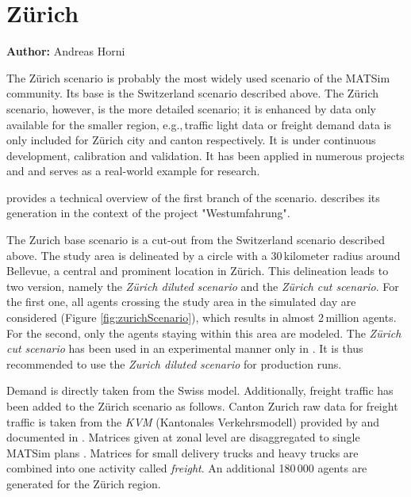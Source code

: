 \section{Zürich}
\label{sec:zhscenario}
\hfill \textbf{Author:} Andreas Horni

The Zürich scenario is probably the most widely used scenario of the MATSim community. Its base is the Switzerland scenario described above. The Zürich scenario, however, is the more detailed scenario; it is enhanced by data only available for the smaller region, e.g.,\,traffic light data or freight demand data is only included for Zürich city and canton respectively. It is under continuous development, calibration and validation. It has been applied in numerous projects and and serves as a real-world example for research.   

\citet{HorniEtAl_TechRep_IVT_2011_a} provides a technical overview of the first branch of the scenario. \citet[][]{BalmerEtAl_ResRep_bdktzrh_2009} describes its generation in the context of the project "Westumfahrung". 

The Zurich base scenario is a cut-out from the Switzerland scenario described above. The study area is delineated by a circle with a 30\,kilometer radius around Bellevue, a central and prominent location in Zürich. This delineation leads to two version, namely the \emph{Zürich diluted scenario} and the \emph{Zürich cut scenario}. For the first one, all agents crossing the study area in the simulated day are considered (Figure \ref{fig:zurichScenario}), which results in almost 2\,million agents. For the second, only the agents staying within this area are modeled. The \emph{Zürich cut scenario} has been used in an experimental manner only in \citet[][]{Hackney_PhDThesis_2009}. It is thus recommended to use the \emph{Zurich diluted scenario} for production runs.

Demand is directly taken from the Swiss model. Additionally, freight traffic has been added to the Zürich scenario as follows. Canton Zurich raw data for freight traffic is taken from the \emph{KVM} (Kantonales Verkehrsmodell) provided by \citet{AMV_Webpage_2011} and documented in \citet[][]{GottardiBuergler_SV_1999}. Matrices given at zonal level are disaggregated to single MATSim plans \citep[][]{ShahM_TechRep_IVT_2010}. Matrices for small delivery trucks and heavy trucks are combined into one activity called \emph{freight}. An additional 180\,000 agents are generated for the Zürich region.

